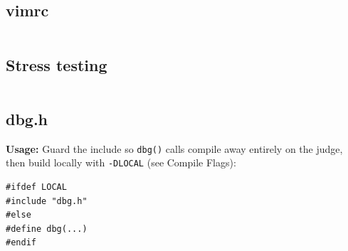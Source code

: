   \subsection{vimrc}
    \inputminted{vim}{library/template/.vimrc}
  \subsection{Stress testing}
    \inputminted{bash}{library/template/stress.sh}
  \subsection{dbg.h}
    \par \textbf{Usage:} Guard the include so \texttt{dbg()} calls compile away entirely on the judge, then build locally with \texttt{-DLOCAL} (see Compile Flags):
\begin{verbatim}
#ifdef LOCAL
#include "dbg.h"
#else
#define dbg(...)
#endif
\end{verbatim}
    \inputminted{cpp}{library/template/dbg.h}

